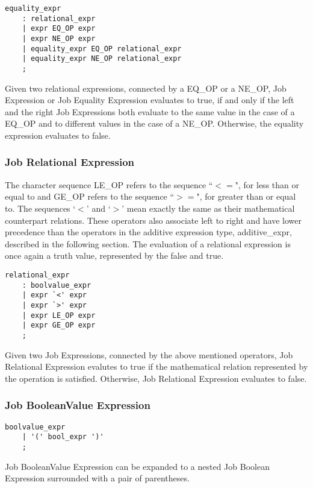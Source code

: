 \documentclass[prodmode,acmtecs]{acmsmall}
\begin{document}
\begin{lstlisting}
equality_expr
	: relational_expr
	| expr EQ_OP expr
	| expr NE_OP expr
	| equality_expr EQ_OP relational_expr
	| equality_expr NE_OP relational_expr
	;
\end{lstlisting}

Given two relational expressions, connected by a EQ\_OP or a NE\_OP, 
Job Expression or Job Equality Expression evaluates to true, 
if and only if the left and the right Job Expressions both evaluate
to the same value in the case of a EQ\_OP and to different values in
the case of a NE\_OP.  Otherwise, the equality expression evaluates
to false.
\medskip

\subsubsection{Job Relational Expression}

The character sequence LE\_OP refers to the sequence ``$<=$", for less 
than or equal to and GE\_OP refers to the sequence ``$>=$", for greater 
than or equal to. The sequences `$<$' and `$>$' mean exactly the same as 
their mathematical counterpart relations. These operators also associate 
left to right and have lower precedence than the operators in the additive 
expression type, additive\_expr, described in the following section. The 
evaluation of a relational expression is once again a truth value, 
represented by the false and true. 

\begin{lstlisting}
relational_expr
	: boolvalue_expr
	| expr `<' expr
	| expr `>' expr
	| expr LE_OP expr
	| expr GE_OP expr
	;
\end{lstlisting}

Given two Job Expressions, connected by the above mentioned operators, 
Job Relational Expression evalutes to true if the mathematical relation
represented by the operation is satisfied. Otherwise, Job Relational
Expression evaluates to false. 
\medskip


\subsubsection{Job BooleanValue Expression}

\begin{lstlisting}
boolvalue_expr
	| '(' bool_expr ')'
	;
\end{lstlisting}

Job BooleanValue Expression can be expanded
to a nested Job Boolean Expression surrounded with a pair of parentheses.
\end{document}
